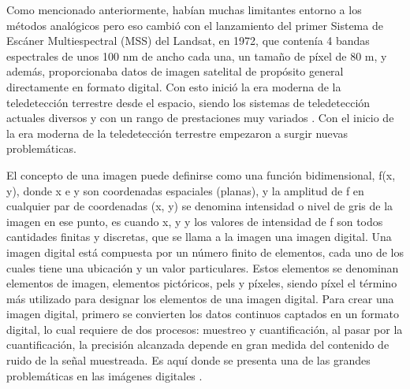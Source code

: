 \documentclass[conference]{IEEEtran}
\begin{document}
Como mencionado anteriormente, habían muchas limitantes entorno a los métodos analógicos pero eso cambió con el lanzamiento del primer Sistema de Escáner Multiespectral (MSS) del Landsat, en 1972, que contenía 4 bandas espectrales de unos 100 nm de ancho cada una, un tamaño de píxel de 80 m, y además, proporcionaba datos de imagen satelital de propósito general directamente en formato digital. Con esto inició la era moderna de la teledetección terrestre desde el espacio, siendo los sistemas de teledetección actuales diversos y con un rango de prestaciones muy variados \cite{schowengerdt2006}. Con el inicio de la era moderna de la teledetección terrestre empezaron a surgir nuevas problemáticas. 

El concepto de una imagen puede definirse como una función bidimensional, f(x, y), donde x e y son coordenadas espaciales (planas), y la amplitud de f en cualquier par de coordenadas (x, y) se denomina intensidad o nivel de gris de la imagen en ese punto, es cuando x, y y los valores de intensidad de f son todos cantidades finitas y discretas, que se llama a la imagen una imagen digital. Una imagen digital está compuesta por un número finito de elementos, cada uno de los cuales tiene una ubicación y un valor particulares. Estos elementos se denominan elementos de imagen, elementos pictóricos, pels y píxeles, siendo píxel el término más utilizado para designar los elementos de una imagen digital. Para crear una imagen digital, primero se convierten los datos continuos captados en un formato digital, lo cual requiere de dos procesos: muestreo y cuantificación, al pasar por la cuantificación, la precisión alcanzada depende en gran medida del contenido de ruido de la señal muestreada. Es aquí donde se presenta una de las grandes problemáticas en las imágenes digitales \cite{gonzalez2018}.
\end{document}
